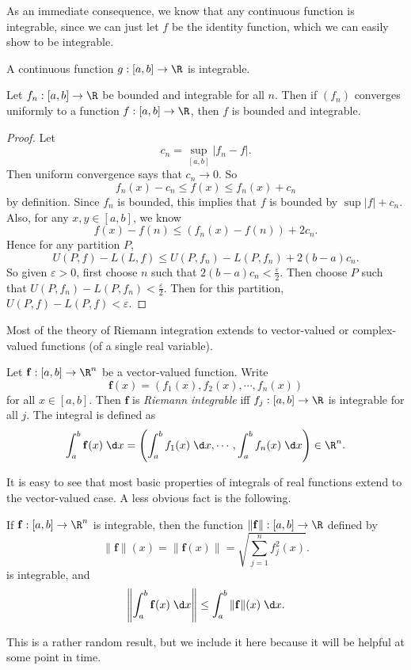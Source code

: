 \documentclass[a4paper]{article}
\begin{document}
As an immediate consequence, we know that any continuous function is integrable, since we can just let $f$ be the identity function, which we can easily show to be integrable.

\begin{cor}
  A continuous function $g:[a, b] \to \R$ is integrable.
\end{cor}

\begin{thm}
  Let $f_n: [a, b] \to \R$ be bounded and integrable for all $n$. Then if $(f_n)$ converges uniformly to a function $f: [a ,b] \to \R$, then $f$ is bounded and integrable.
\end{thm}

\begin{proof}
  Let
  \[
    c_n = \sup_{[a, b]} |f_n - f|.
  \]
  Then uniform convergence says that $c_n \to 0$. So
  \[
    f_n(x) - c_n \leq f(x) \leq f_n(x) + c_n
  \]
  by definition. Since $f_n$ is bounded, this implies that $f$ is bounded by $\sup |f| + c_n$. Also, for any $x, y\in [a, b]$, we know
  \[
    f(x) - f(n) \leq (f_n(x) - f(n)) + 2 c_n.
  \]
  Hence for any partition $P$,
  \[
    U(P, f) - L(L, f) \leq U(P, f_n) - L(P, f_n) + 2(b - a) c_n.
  \]
  So given $\varepsilon > 0$, first choose $n$ such that $2(b - a) c_n < \frac{\varepsilon}{2}$. Then choose $P$ such that $U(P, f_n) - L(P, f_n) < \frac{\varepsilon}{2}$. Then for this partition, $U(P, f) - L(P, f) < \varepsilon$.
\end{proof}

Most of the theory of Riemann integration extends to vector-valued or complex-valued functions (of a single real variable).
\begin{defi}
  Let $\mathbf{f}: [a, b] \to \R^n$ be a vector-valued function. Write
  \[
    \mathbf{f}(x) = (f_1(x), f_2(x), \cdots, f_n(x))
  \]
  for all $x\in [a, b]$. Then $\mathbf{f}$ is \emph{Riemann integrable} iff $f_j: [a, b] \to \R$ is integrable for all $j$. The integral is defined as
  \[
    \int_a^b \mathbf{f}(x)\;\d x = \left(\int_a^b f_1(x)\;\d x, \cdots, \int_a^b f_n(x)\;\d x\right) \in \R^n.
  \]
\end{defi}
It is easy to see that most basic properties of integrals of real functions extend to the vector-valued case. A less obvious fact is the following.
\begin{prop}
  If $\mathbf{f}: [a, b] \to \R^n$ is integrable, then the function $\|\mathbf{f}\|: [a, b] \to \R$ defined by
  \[
    \|\mathbf{f}\|(x) = \|\mathbf{f}(x)\| = \sqrt{\sum_{j = 1}^n f_j^2(x)}.
  \]
  is integrable, and
  \[
    \left\|\int_a^b \mathbf{f}(x)\;\d x\right\| \leq \int_a^b \|\mathbf{f}\|(x)\;\d x.
  \]
\end{prop}
This is a rather random result, but we include it here because it will be helpful at some point in time.
\end{document}
